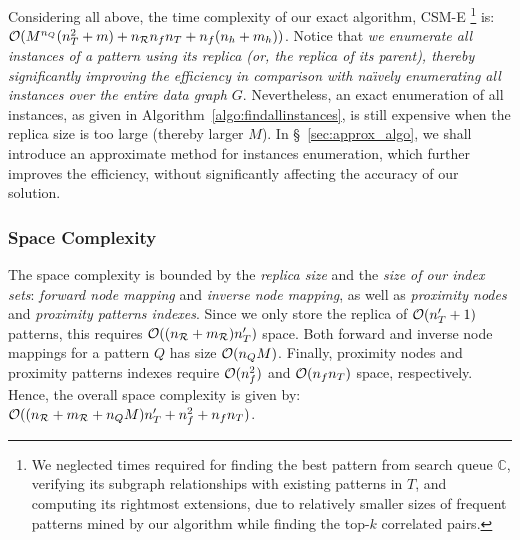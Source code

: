 Considering all above, the time complexity of our exact algorithm, {\sf CSM-E}
\footnote{{\footnotesize We neglected times required for finding the best pattern
from search queue $\mathbb{C}$, verifying its subgraph relationships
with existing patterns in $T$, and computing its rightmost extensions,
due to relatively smaller sizes of frequent patterns mined by our algorithm
while finding the top-$k$ correlated pairs.}} is:
$\mathcal{O}(M^{n_Q}(n_T^2+m)+n_{\mathcal{R}}n_fn_T+n_f(n_h+m_h))$. Notice that
{\em we enumerate all instances of a pattern using its replica
(or, the replica of its parent), thereby significantly improving the efficiency in comparison with
na\"{\i}vely enumerating all instances over the entire data graph $G$}. Nevertheless, an exact enumeration of all instances,
as given in Algorithm~\ref{algo:findallinstances}, is still expensive when the replica size is too large
(thereby larger $M$). In \S~\ref{sec:approx_algo}, we shall introduce an approximate method for instances enumeration,
which further improves the efficiency, without significantly affecting the accuracy of our solution.
%
\subsubsection{Space Complexity}
The space complexity is bounded by the {\em replica size} and the {\em size of our index sets}: {\em forward node mapping}
and {\em inverse node mapping}, as well as {\em proximity nodes} and {\em proximity patterns indexes}.
Since we only store the replica of $\mathcal{O}(n'_T+1)$ patterns, this requires $\mathcal{O}((n_{\mathcal{R}}+m_{\mathcal{R}})n'_T)$ space.
Both forward and inverse node mappings for a pattern $Q$ has size $\mathcal{O}(n_QM)$. Finally, proximity nodes
and proximity patterns indexes require $\mathcal{O}(n_f^2)$ and $\mathcal{O}(n_fn_T)$ space, respectively.  Hence, the overall
space complexity is given by: $\mathcal{O}((n_{\mathcal{R}}+m_{\mathcal{R}}+n_QM)n'_T+n_f^2+n_fn_T)$. 